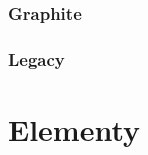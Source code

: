 \documentclass{beamer}
\begin{document}
            \subsubsection{Graphite}
            
            \subsubsection{Legacy}
            
    
	\section{Elementy}
		
		
       
       

% 
\end{document}
